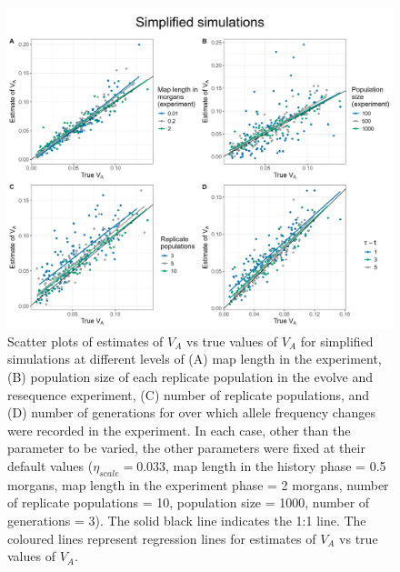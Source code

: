 \documentclass[12pt]{article}
\begin{document}
\begin{bibunit}
\begin{figure}[H]
\includegraphics[scale = 0.12]{Figures/Fig2.jpg}
\caption{Scatter plots of estimates of $V_A$ vs true values of $V_A$ for simplified simulations at different levels of (A) map length in the experiment, (B) population size of each replicate population in the evolve and resequence experiment, (C) number of replicate populations, and (D) number of generations for over which allele frequency changes were recorded in the experiment. In each case, other than the parameter to be varied, the other parameters were fixed at their default values ($\eta_{scale} = 0.033$, map length in the history phase = 0.5 morgans, map length in the experiment phase = 2 morgans, number of replicate populations = 10, population size = 1000, number of generations = 3). The solid black line indicates the 1:1 line. The coloured lines represent regression lines for estimates of $V_A$ vs true values of $V_A$.}
  \label{fig:Figure 2}
\end{figure}


\end{bibunit}
\end{document}
